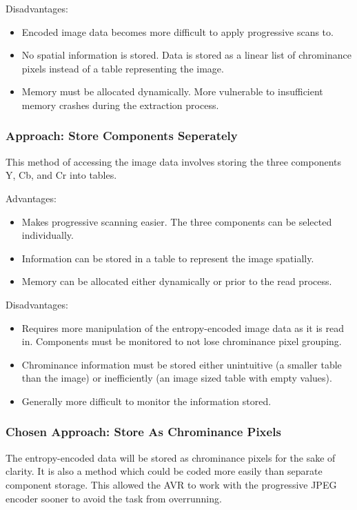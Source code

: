 Disadvantages:
\begin{itemize}
	\item Encoded image data becomes more 
		difficult to apply progressive scans to.
	\item No spatial information is stored. 
		Data is stored as a linear list of chrominance 
		pixels instead of a table representing the image.
	\item Memory must be allocated dynamically. 
		More vulnerable to insufficient memory 
		crashes during the extraction process.
\end{itemize}

\subsubsection{Approach: Store Components Seperately}

This method of accessing the image data involves 
storing the three components Y, Cb, and Cr into tables.

Advantages:
\begin{itemize}
	\item Makes progressive scanning easier. 
		The three components can be selected individually.
	\item Information can be stored in a table to 
		represent the image spatially.
	\item Memory can be allocated either 
		dynamically or prior to the read process.
\end{itemize}

Disadvantages:
\begin{itemize}
	\item Requires more manipulation of the 
		entropy-encoded image data as it is read in. 
		Components must be monitored to not 
		lose chrominance pixel grouping.
	\item Chrominance information must be stored either 
		unintuitive (a smaller table than the image) or 
		inefficiently (an image sized table with empty values).
	\item Generally more difficult to monitor the information stored.
\end{itemize}

\subsubsection{Chosen Approach: Store As Chrominance Pixels}

The entropy-encoded data will be stored as chrominance 
pixels for the sake of clarity. 
It is also a method which could be coded more easily 
than separate component storage. 
This allowed the AVR to work with the progressive 
JPEG encoder sooner to avoid the task from overrunning.
